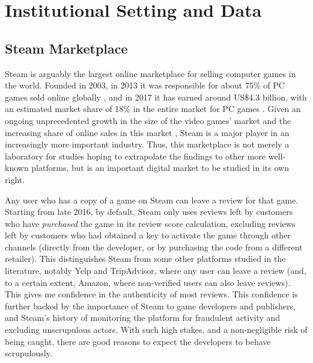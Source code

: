 \documentclass[
  12pt,
  pagebackref]{article}
\begin{document}
\hypertarget{institutional-setting-and-data}{%
\section{Institutional Setting and
Data}\label{institutional-setting-and-data}}

\hypertarget{steam-marketplace}{%
\subsection{Steam Marketplace}\label{steam-marketplace}}

Steam is arguably the largest online marketplace for selling computer
games in the world. Founded in 2003, in 2013 it was responsible for
about 75\% of PC games sold online globally \citep{steamBloomberg}, and
in 2017 it has earned around US\$4.3 billion, with an estimated market
share of 18\% in the entire market for PC games \citep{psgames}. Given
an ongoing unprecedented growth in the size of the video games' market
\citep[\$43.4 billion in 2018, about the size of the U.S. film
industry,][]{videoGamesMarket} and the increasing share of online sales
in this market \citep[83\% in 2018, compared to 20\% in
2009,][]{steamNPD}, Steam is a major player in an increasingly more
important industry. Thus, this marketplace is not merely a laboratory
for studies hoping to extrapolate the findings to other more well-known
platforms, but is an important digital market to be studied in its own
right.

Any user who has a copy of a game on Steam can leave a review for that
game. Starting from late 2016, by default, Steam only uses reviews left
by customers who have \emph{purchased} the game in its review score
calculation, excluding reviews left by customers who had obtained a key
to activate the game through other channels (directly from the
developer, or by purchasing the code from a different retailer). This
distinguishes Steam from some other platforms studied in the literature,
notably Yelp and TripAdvisor, where any user can leave a review (and, to
a certain extent, Amazon, where non-verified users can also leave
reviews). This gives me confidence in the authenticity of most reviews.
This confidence is further backed by the importance of Steam to game
developers and publishers, and Steam's history of monitoring the
platform for fraudulent activity and excluding unscrupulous actors. With
such high stakes, and a non-negligible risk of being caught, there are
good reasons to expect the developers to behave scrupulously.
\end{document}

